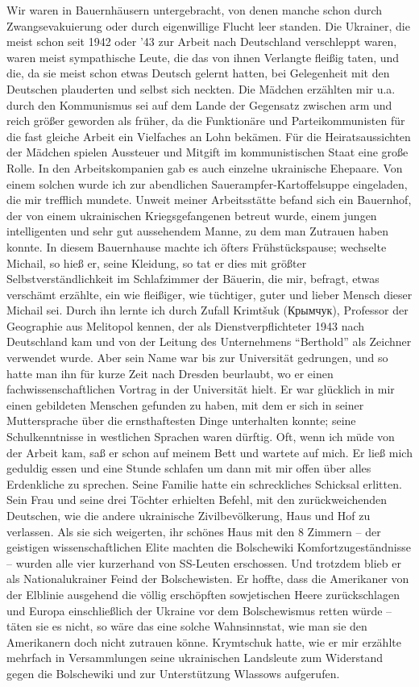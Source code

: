  Wir waren in Bauernhäusern untergebracht, von denen manche schon durch Zwangsevakuierung oder durch eigenwillige Flucht leer standen. Die Ukrainer, die meist schon seit 1942 oder '43 zur Arbeit nach Deutschland verschleppt waren, waren meist sympathische Leute, die das von ihnen Verlangte fleißig taten, und die, da sie meist schon etwas Deutsch gelernt hatten, bei Gelegenheit mit den Deutschen plauderten und selbst sich neckten. Die Mädchen erzählten mir u.a. durch den Kommunismus sei auf dem Lande der Gegensatz zwischen arm und reich größer geworden als früher, da die Funktionäre und Parteikommunisten für die fast gleiche Arbeit ein Vielfaches an Lohn bekämen. Für die Heiratsaussichten der Mädchen spielen Aussteuer und Mitgift im kommunistischen Staat eine große Rolle. In den Arbeitskompanien gab es auch einzelne ukrainische Ehepaare. Von einem solchen wurde ich zur abendlichen Sauerampfer-Kartoffelsuppe eingeladen, die mir trefflich mundete. Unweit meiner Arbeitsstätte befand sich ein Bauernhof, der von einem ukrainischen Kriegsgefangenen betreut wurde, einem  jungen intelligenten und sehr gut aussehendem Manne, zu dem man Zutrauen haben konnte. In diesem Bauernhause machte ich öfters Frühstückspause; wechselte Michail, so hieß er, seine Kleidung, so tat er dies mit größter Selbstverständlichkeit im Schlafzimmer der Bäuerin, die mir, befragt, etwas verschämt erzählte, ein wie fleißiger, wie tüchtiger, guter und lieber Mensch dieser Michail sei. Durch ihn lernte ich durch Zufall Krimtšuk (Крымчук), Professor der Geographie aus Melitopol kennen, der als Dienstverpflichteter 1943 nach Deutschland kam und von der Leitung des Unternehmens \enquote{Berthold} als Zeichner verwendet wurde. Aber sein Name war bis zur Universität gedrungen, und so hatte man ihn für kurze Zeit nach Dresden beurlaubt, wo er einen fachwissenschaftlichen Vortrag in der Universität hielt. Er war glücklich in mir einen gebildeten Menschen gefunden zu haben, mit dem er sich in seiner Muttersprache über die ernsthaftesten Dinge unterhalten konnte; seine Schulkenntnisse in westlichen Sprachen waren dürftig. Oft, wenn ich müde von der Arbeit kam, saß er schon auf meinem Bett und wartete auf mich. Er ließ mich geduldig essen und eine Stunde schlafen um dann mit mir offen über alles Erdenkliche zu sprechen. Seine Familie hatte ein schreckliches Schicksal erlitten. Sein  Frau und seine drei Töchter erhielten Befehl, mit den zurückweichenden Deutschen, wie die andere ukrainische Zivilbevölkerung, Haus und Hof zu verlassen. Als sie sich weigerten, ihr schönes Haus mit den 8 Zimmern -- der geistigen wissenschaftlichen Elite machten die Bolschewiki Komfortzugeständnisse -- wurden alle vier kurzerhand von SS-Leuten erschossen. Und trotzdem blieb er als Nationalukrainer Feind der Bolschewisten. Er hoffte, dass die Amerikaner von der Elblinie ausgehend die völlig erschöpften sowjetischen Heere zurückschlagen und Europa einschließlich der Ukraine vor dem Bolschewismus retten würde -- täten sie es nicht, so wäre das eine solche Wahnsinnstat, wie man sie den Amerikanern doch nicht zutrauen könne. Krymtschuk hatte, wie er mir erzählte mehrfach in Versammlungen seine ukrainischen Landsleute zum Widerstand gegen die Bolschewiki und zur Unterstützung Wlassows aufgerufen.

